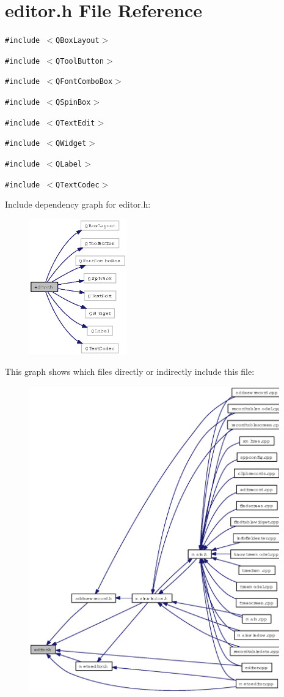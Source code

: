 \section{editor.h File Reference}
\label{editor_8h}
{\tt \#include $<$QBox\-Layout$>$}\par
{\tt \#include $<$QTool\-Button$>$}\par
{\tt \#include $<$QFont\-Combo\-Box$>$}\par
{\tt \#include $<$QSpin\-Box$>$}\par
{\tt \#include $<$QText\-Edit$>$}\par
{\tt \#include $<$QWidget$>$}\par
{\tt \#include $<$QLabel$>$}\par
{\tt \#include $<$QText\-Codec$>$}\par


Include dependency graph for editor.h:\begin{figure}[H]
\begin{center}
\leavevmode
\includegraphics[width=119pt]{editor_8h__incl}
\end{center}
\end{figure}


This graph shows which files directly or indirectly include this file:\begin{figure}[H]
\begin{center}
\leavevmode
\includegraphics[width=307pt]{editor_8h__dep__incl}
\end{center}
\end{figure}
